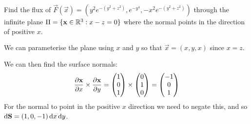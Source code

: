\documentclass[../main.tex]{subfiles}
\begin{document}
\begin{example}
  Find the flux of $\vec{F}(\vec{x}) = (y^2 e^{-(y^2 + z^2)}, e^{-y^4}, -x^2 e^{-(y^2 + z^2)})$ through the infinite plane $\Pi = \{\mathbf{\bm{x}} \in \mathbb{R}^3 : x - z = 0\}$ where the normal points in the direction of positive $x$.

  We can parameterise the plane using $x$ and $y$ so that $\vec{x} = (x, y, x)$ since $x = z$.

  We can then find the surface normals:
  \[
    \pderiv{\vec{x}}{x} \times \pderiv{\vec{x}}{y} = \begin{pmatrix}
    1 \\
    0 \\
    1 \\
    \end{pmatrix} \times \begin{pmatrix}
    0 \\
    1 \\
    0 \\
    \end{pmatrix} = \begin{pmatrix}
    -1 \\
    0 \\
    1 \\
    \end{pmatrix}
  \]
  For the normal to point in the positive $x$ direction we need to negate this, and so $\d{\vec{S}} = (1, 0, -1) \d{x} \d{y}$.


\end{example}
\end{document}
